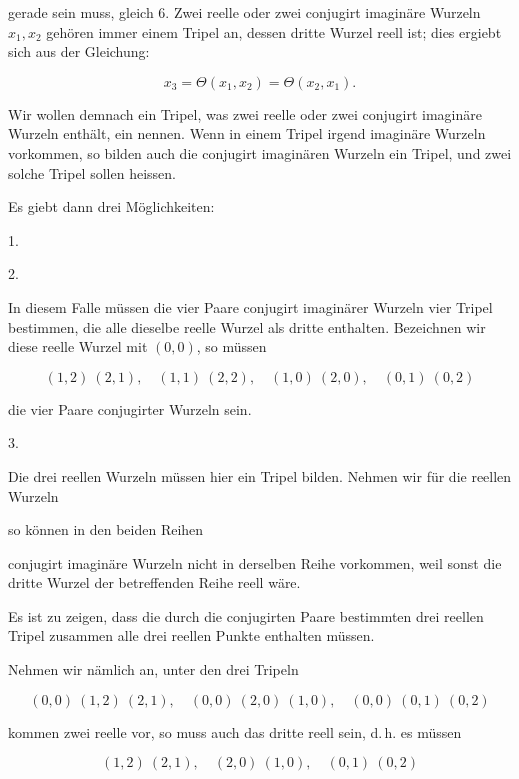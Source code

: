 gerade sein muss, gleich 6. Zwei reelle oder zwei conjugirt imaginäre Wurzeln
$x_1, x_2$ gehören immer einem Tripel an, dessen dritte Wurzel reell ist; dies
ergiebt sich aus der Gleichung:

\[
x_3 = \Theta (x_1, x_2) = \Theta (x_2, x_1).
\]

Wir wollen demnach ein Tripel, was zwei reelle oder zwei conjugirt imaginäre Wurzeln
enthält, ein  nennen. Wenn in einem Tripel irgend imaginäre
Wurzeln vorkommen, so bilden auch die conjugirt imaginären Wurzeln ein Tripel, und
zwei solche Tripel sollen  heissen.

Es giebt dann drei Möglichkeiten:

1. 

2. 

In diesem Falle müssen die vier Paare conjugirt imaginärer Wurzeln vier Tripel
bestimmen, die alle dieselbe reelle Wurzel als dritte enthalten. Bezeichnen wir
diese reelle Wurzel mit $(0,0)$, so müssen

\[
(1,2)\ (2,1),\quad (1,1)\ (2,2),\quad (1,0)\ (2,0),\quad (0,1)\ (0,2)
\]

die vier Paare conjugirter Wurzeln sein.

3. 

Die drei reellen Wurzeln müssen hier ein Tripel bilden. Nehmen wir für die reellen
Wurzeln


so können in den beiden Reihen


conjugirt imaginäre Wurzeln nicht in derselben Reihe vorkommen, weil sonst die
dritte Wurzel der betreffenden Reihe reell wäre.

Es ist zu zeigen, dass die durch die conjugirten Paare bestimmten drei reellen
Tripel zusammen alle drei reellen Punkte enthalten müssen.

Nehmen wir nämlich an, unter den drei Tripeln

\[
(0,0)\ (1,2)\ (2,1),\quad (0,0)\ (2,0)\ (1,0),\quad (0,0)\ (0,1)\ (0,2)
\]

kommen zwei reelle vor, so muss auch das dritte reell sein, d.\,h. es müssen

\[
(1,2)\ (2,1),\quad (2,0)\ (1,0),\quad (0,1)\ (0,2)
\]
